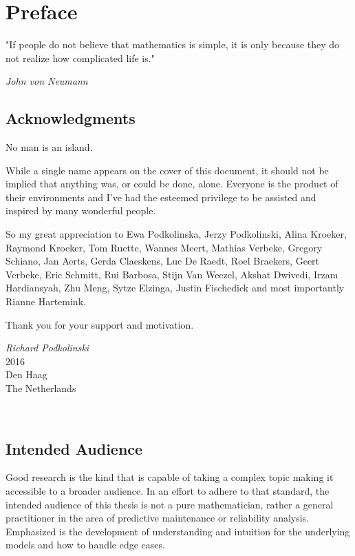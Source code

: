 \chapter*{Preface}

\begin{displayquote}
"If people do not believe that mathematics is simple, it is only because they do not realize how complicated life is." 
\end{displayquote}

\begin{flushright}
\textit{John von Neumann}
\end{flushright}


\section*{Acknowledgments}

No man is an island.

While a single name appears on the cover of this document, it should not be implied that anything was, or could be done, alone. Everyone is the product of their environments and I've had the esteemed privilege to be assisted and inspired by many wonderful people. 

So my great appreciation to Ewa Podkolinska, Jerzy Podkolinski, Alina Kroeker, Raymond Kroeker, Tom Ruette, Wannes Meert, Mathias Verbeke, Gregory Schiano, Jan Aerts, Gerda Claeskens, Luc De Raedt, Roel Braekers, Geert Verbeke, Eric Schmitt, Rui Barbosa, Stijn Van Weezel, Akshat Dwivedi, Irzam Hardiansyah, Zhu Meng, Sytze Elzinga, Justin Fischedick and most importantly Rianne Hartemink.

Thank you for your support and motivation. 

\begin{flushright}
\textit{Richard Podkolinski}
\\
2016 
\\
Den Haag
\\
The Netherlands
\end{flushright}
\\

\section*{Intended Audience}

Good research is the kind that is capable of taking a complex topic making it accessible to a broader audience. In an effort to adhere to that standard, the intended audience of this thesis is not a pure mathematician, rather a general practitioner in the area of predictive maintenance or reliability analysis. Emphasized is the development of understanding and intuition for the underlying models and how to handle edge cases. 

